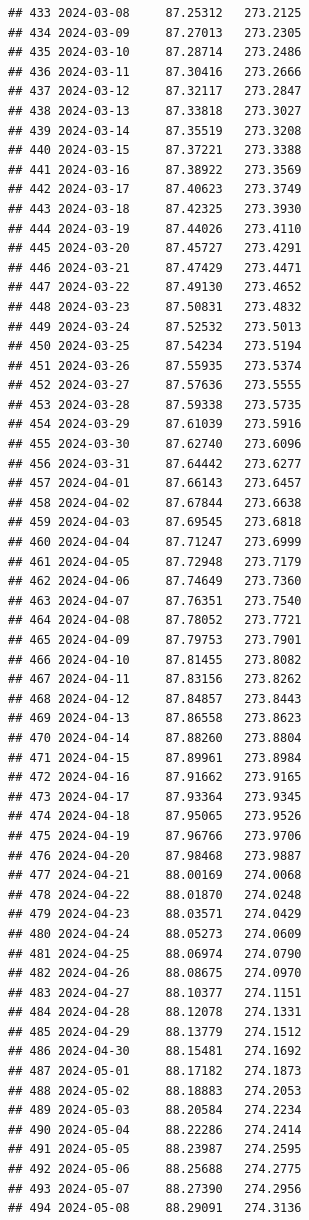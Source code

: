 \documentclass[
]{article}
\begin{document}
\begin{verbatim}
## 433 2024-03-08     87.25312   273.2125
## 434 2024-03-09     87.27013   273.2305
## 435 2024-03-10     87.28714   273.2486
## 436 2024-03-11     87.30416   273.2666
## 437 2024-03-12     87.32117   273.2847
## 438 2024-03-13     87.33818   273.3027
## 439 2024-03-14     87.35519   273.3208
## 440 2024-03-15     87.37221   273.3388
## 441 2024-03-16     87.38922   273.3569
## 442 2024-03-17     87.40623   273.3749
## 443 2024-03-18     87.42325   273.3930
## 444 2024-03-19     87.44026   273.4110
## 445 2024-03-20     87.45727   273.4291
## 446 2024-03-21     87.47429   273.4471
## 447 2024-03-22     87.49130   273.4652
## 448 2024-03-23     87.50831   273.4832
## 449 2024-03-24     87.52532   273.5013
## 450 2024-03-25     87.54234   273.5194
## 451 2024-03-26     87.55935   273.5374
## 452 2024-03-27     87.57636   273.5555
## 453 2024-03-28     87.59338   273.5735
## 454 2024-03-29     87.61039   273.5916
## 455 2024-03-30     87.62740   273.6096
## 456 2024-03-31     87.64442   273.6277
## 457 2024-04-01     87.66143   273.6457
## 458 2024-04-02     87.67844   273.6638
## 459 2024-04-03     87.69545   273.6818
## 460 2024-04-04     87.71247   273.6999
## 461 2024-04-05     87.72948   273.7179
## 462 2024-04-06     87.74649   273.7360
## 463 2024-04-07     87.76351   273.7540
## 464 2024-04-08     87.78052   273.7721
## 465 2024-04-09     87.79753   273.7901
## 466 2024-04-10     87.81455   273.8082
## 467 2024-04-11     87.83156   273.8262
## 468 2024-04-12     87.84857   273.8443
## 469 2024-04-13     87.86558   273.8623
## 470 2024-04-14     87.88260   273.8804
## 471 2024-04-15     87.89961   273.8984
## 472 2024-04-16     87.91662   273.9165
## 473 2024-04-17     87.93364   273.9345
## 474 2024-04-18     87.95065   273.9526
## 475 2024-04-19     87.96766   273.9706
## 476 2024-04-20     87.98468   273.9887
## 477 2024-04-21     88.00169   274.0068
## 478 2024-04-22     88.01870   274.0248
## 479 2024-04-23     88.03571   274.0429
## 480 2024-04-24     88.05273   274.0609
## 481 2024-04-25     88.06974   274.0790
## 482 2024-04-26     88.08675   274.0970
## 483 2024-04-27     88.10377   274.1151
## 484 2024-04-28     88.12078   274.1331
## 485 2024-04-29     88.13779   274.1512
## 486 2024-04-30     88.15481   274.1692
## 487 2024-05-01     88.17182   274.1873
## 488 2024-05-02     88.18883   274.2053
## 489 2024-05-03     88.20584   274.2234
## 490 2024-05-04     88.22286   274.2414
## 491 2024-05-05     88.23987   274.2595
## 492 2024-05-06     88.25688   274.2775
## 493 2024-05-07     88.27390   274.2956
## 494 2024-05-08     88.29091   274.3136

\end{verbatim}
\end{document}
